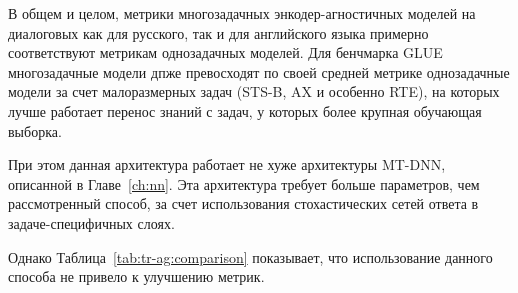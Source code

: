 В общем и целом, метрики многозадачных энкодер-агностичных моделей на диалоговых как для русского, так и для английского языка примерно соответствуют метрикам однозадачных моделей.
 Для бенчмарка GLUE многозадачные модели дпже превосходят по своей средней метрике однозадачные модели за счет малоразмерных задач (STS-B, AX и особенно RTE), на которых лучше работает перенос знаний с задач, у которых более крупная обучающая выборка. 

При этом данная архитектура работает не хуже архитектуры MT-DNN, описанной в Главе~\ref{ch:nn}.
Эта архитектура требует больше параметров, чем рассмотренный способ, за счет использования стохастических сетей ответа в задаче-специфичных слоях.

Однако Таблица~\ref{tab:tr-ag:comparison} показывает, что использование данного способа не привело к улучшению метрик.

\begin{table*}
 \caption{Точность/f1 macro на задачах из Таблицы~\ref{tab:tr-ag:en_results} для MT-DNN и для базовой модели distilbert-base-cased. Энкодер-агн. означает энкодер-агностичную модель. Усреднено по 13 запускам.}
 \label{tab:tr-ag:comparison}
\centering
\resizebox{\textwidth}{!}{%
\begin{tabular}{|c|c|c|c|c|c|c|c|c|}
\hline
\multirow{2}{*}{Модель} & Число & \multirow{2}{*}{Среднее} & Эмоции & Тональность & Токсичность & Интенты & Темы & Число \\
& параметров & & 39.4k & 80.5k & 127.6k & 11.5k & 11.5k & батчей \\ \hline \hline
{Энкодер-агн.} & \textbf{65,850,714} & \textbf{82.1}/77.2 & \textbf{67.7/60.7} & \textbf{75.2/75.0} & 90.6/79.8 & 86.3/80.4 & 90.8/90.1 & 14000  \\ \hline
{MT-DNN} & 68,014,424 & \textbf{82.1/77.4} & 67.5/59.9 & 73.9/73.5 & \textbf{91.5/80.9} & \textbf{87.0/82.4} & \textbf{91.0/90.4} & 19600 \\ \hline
\end{tabular}}
\end{table*}

